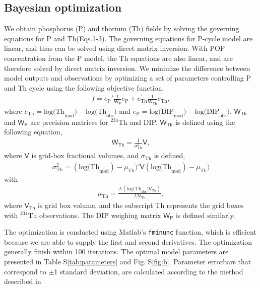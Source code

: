 \subsection{Bayesian optimization}
We obtain phosphorus (P) and thorium (Th) fields by solving the governing equations for P and Th(Eqs.1-3).
The governing equations for P-cycle model are linear, and thus can be solved using direct matrix inversion.
With POP concentration from the P model, the Th equations are also linear, and are therefore solved by direct matrix inversion.
We minimize the difference between model outputs and observations by optimizing a set of parameters controlling P and Th cycle using the following objective function.
\begin{align*}
f = e_{\textrm{P}}{'}\frac{1}{\boldsymbol{\mathsf{W_P}}}e_\textrm{P} + e_{\textrm{Th}}^{'}\frac{1}{\boldsymbol{\mathsf{W_{Th}}}}e_{\textrm{Th}},
\end{align*}
where $ e_{\textrm{Th}} = \textrm{log(Th}_{\textrm{mod}})-\textrm{log(Th}_{\textrm{obs}})$ and $e_{\textrm{P}} = \textrm{log(DIP}_{\textrm{mod}})-\textrm{log(DIP}_{\textrm{obs}})$.
$\boldsymbol{\mathsf{W_{Th}}}$ and $\boldsymbol{\mathsf{W_{P}}}$ are precision matrices for $^{234}$Th and DIP. $\boldsymbol{\mathsf{W_{Th}}}$ is defined using the following equation,
\begin{align*}
\boldsymbol{\mathsf{W_{Th}}} = \frac{1}{\sigma^2_{\textrm{Th}}}\boldsymbol{\mathsf{V}},
\end{align*}
where $\boldsymbol{\mathsf{V}}$ is grid-box fractional volumes, and $\sigma_{\textrm{Th}}$ is defined,
\begin{align*}
\sigma^2_{\textrm{Th}} = (\textrm{log(Th}_{\textrm{mod}})-\mu_{\textrm{Th}})'\boldsymbol{\mathsf{V}}(\textrm{log(Th}_{\textrm{mod}})-\mu_{\textrm{Th}})
\end{align*}
with
\begin{align*}
\mu_{\textrm{Th}} = \frac{\Sigma({\textrm{log(Th}_{\textrm{obs}})\boldsymbol{\mathsf{V_{Th}}}})}{\Sigma{\boldsymbol{\mathsf{V_{Th}}}}},
\end{align*}
where $\boldsymbol{\mathsf{V_{Th}}}$ is grid box volume, and the subscript Th represents the grid boxes with $^{234}$Th observations.
The DIP weighing matrix $\boldsymbol{\mathsf{W_{P}}}$ is defined similarly.

The optimization is conducted using Matlab's \verb+fminunc+ function, which is efficient because we are able to supply the first and second derivatives.
The optimization generally finish within 100 iterations.
The optimal model parameters are presented in Table S\ref{tab:parameters} and Fig. S\ref{fig:b}.
Parameter errorbars that correspond to $\pm$1 standard deviation, are calculated according to the method described in\cite{Wang2019}


